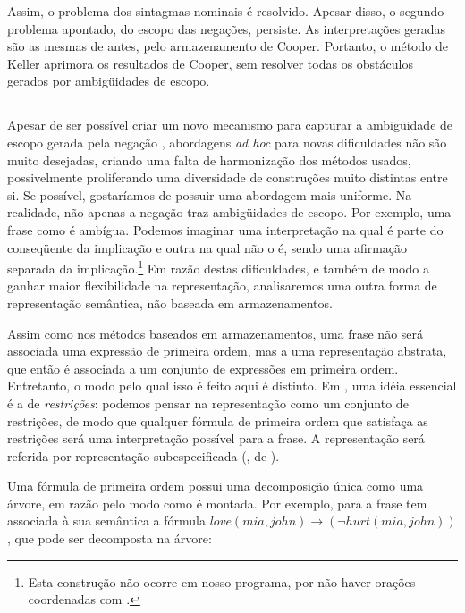Assim, o problema dos sintagmas nominais é resolvido. Apesar disso, o segundo problema apontado, do escopo das negações, persiste. As interpretações geradas são as mesmas de antes, pelo armazenamento de Cooper.  Portanto, o método de Keller aprimora os resultados de Cooper, sem resolver todas os obstáculos gerados por ambigüidades de escopo.

\subsection{}

Apesar de ser possível criar um novo mecanismo para capturar a ambigüidade de escopo gerada pela negação , abordagens \textit{ad hoc} para novas dificuldades não são muito desejadas, criando uma falta de harmonização dos métodos usados, possivelmente proliferando uma diversidade de construções muito distintas entre si. Se possível, gostaríamos de possuir uma abordagem mais uniforme. Na realidade, não apenas a negação traz ambigüidades de escopo. Por exemplo, uma frase como  é ambígua. \cite{HoleSem} Podemos imaginar uma interpretação na qual  é parte do conseqüente da implicação e outra na qual não o é, sendo uma afirmação separada da implicação.\footnote{Esta construção não ocorre em nosso programa, por não haver orações coordenadas com .} Em razão destas dificuldades, e também de modo a ganhar maior flexibilidade na representação, analisaremos uma outra forma de representação semântica, não baseada em armazenamentos. 

Assim como nos métodos baseados em armazenamentos, uma frase não será associada uma expressão de primeira ordem, mas a uma representação abstrata, que então é associada a um conjunto de expressões em primeira ordem. Entretanto, o modo pelo qual isso é feito aqui é distinto. Em , uma idéia essencial é a de \textit{restrições}: podemos pensar na representação como um conjunto de restrições, de modo que qualquer fórmula de primeira ordem que satisfaça as restrições será uma interpretação possível para a frase. \cite[p.~129]{BlackburnBos:2005} A representação será referida por representação subespecificada (, de ).

Uma fórmula de primeira ordem possui uma decomposição única como uma árvore, em razão pelo modo como é montada. Por exemplo, para a frase  tem associada à sua semântica a fórmula $love(mia,john) \rightarrow (\neg hurt(mia,john))$, que pode ser decomposta na árvore:

